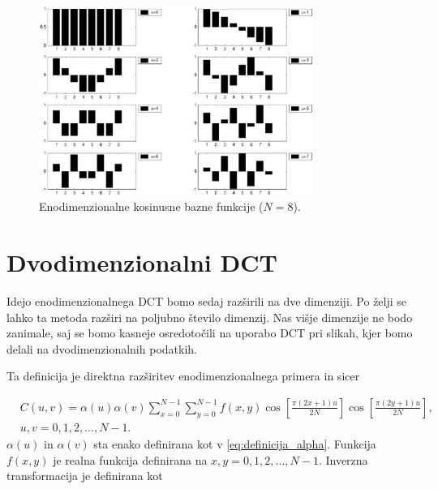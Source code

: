 \documentclass[a4paper,12pt,openright]{book}
\begin{document}
\begin{figure}[ht] %
\begin{center}
\includegraphics[width=0.8\textwidth]{slike/bazne_funkcije_1D.pdf}
\end{center}
\caption{Enodimenzionalne kosinusne bazne funkcije (\(N=8\)).}
\label{1D_bazne_funkcije}
\end{figure}



\section{Dvodimenzionalni DCT} %

Idejo enodimenzionalnega DCT bomo sedaj razširili na dve dimenziji. Po želji se lahko ta metoda razširi na poljubno število dimenzij. Nas višje dimenzije ne bodo zanimale, saj se bomo kasneje osredotočili na uporabo DCT pri slikah, kjer bomo delali na dvodimenzionalnih podatkih. \par
Ta definicija je direktna razširitev enodimenzionalnega primera in sicer

\begin{equation}
    \begin{aligned}
    &C(u,v) = \alpha(u) \alpha(v) \sum_{x=0}^{N-1}\sum_{y=0}^{N-1} f(x,y)
    \cos\left[\frac{\pi(2x+1)u}{2N}\right]
    \cos\left[\frac{\pi(2y+1)u}{2N}\right], \\
    &u,v = 0,1,2,\ldots,N-1.
    \end{aligned}
\label{eq:2D-DCT}
\end{equation}
\(\alpha(u)\) in \(\alpha(v)\) sta enako definirana kot v \ref{eq:definicija_alpha}. Funkcija \(f(x,y)\) je realna funkcija definirana na \(x,y = 0,1,2,\ldots,N-1\). Inverzna transformacija je definirana kot
\end{document}
